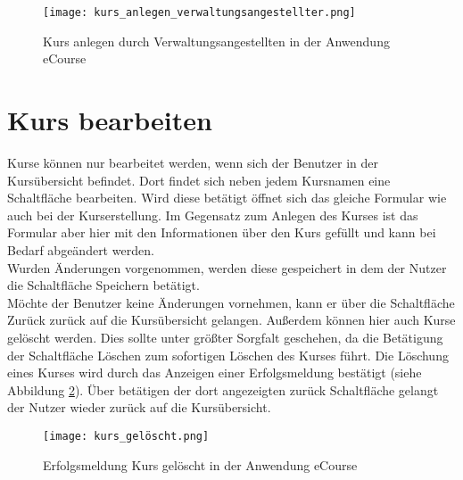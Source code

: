 \begin{figure}[h]
\centering
\texttt{[image: kurs\_anlegen\_verwaltungsangestellter.png]}
\caption{Kurs anlegen durch Verwaltungsangestellten in der Anwendung eCourse}
\label{fib:ke}
\end{figure}


\section{Kurs bearbeiten}
Kurse können nur bearbeitet werden, wenn sich der Benutzer in der Kursübersicht befindet. Dort findet sich neben jedem Kursnamen eine Schaltfläche \glqq bearbeiten\grqq . Wird diese betätigt öffnet sich das gleiche Formular wie auch bei der Kurserstellung. Im Gegensatz zum Anlegen des Kurses ist das Formular aber hier mit den Informationen über den Kurs gefüllt und kann bei Bedarf abgeändert werden.\\
Wurden Änderungen vorgenommen, werden diese gespeichert in dem der Nutzer die Schaltfläche \glqq Speichern\grqq{} betätigt.\\
Möchte der Benutzer keine Änderungen vornehmen, kann er über die Schaltfläche \glqq Zurück\grqq{} zurück auf die Kursübersicht gelangen.
Außerdem können hier auch Kurse gelöscht werden. Dies sollte unter größter Sorgfalt geschehen, da die Betätigung der Schaltfläche \glqq Löschen\grqq{} zum sofortigen Löschen des Kurses führt. Die Löschung eines Kurses wird durch das Anzeigen einer Erfolgsmeldung bestätigt (siehe Abbildung \ref{fib:kl}). Über betätigen der dort angezeigten \glqq zurück\grqq{} Schaltfläche gelangt der Nutzer wieder zurück auf die Kursübersicht.

\begin{figure}[h]
\centering
\texttt{[image: kurs\_gelöscht.png]}
\caption{Erfolgsmeldung Kurs gelöscht in der Anwendung eCourse}
\label{fib:kl}
\end{figure}

